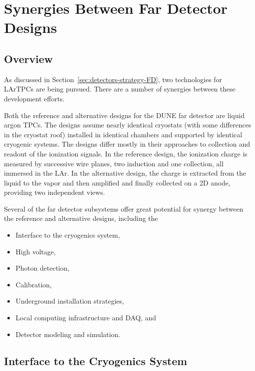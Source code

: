 \chapter{Synergies Between Far Detector Designs}
\label{ch:detectors-synergy}

\section{Overview}

As discussed in Section~\ref{sec:detectors-strategy-FD}, two
technologies for LArTPCs are being pursued. There are a number of
synergies between these development efforts.

Both the reference and alternative designs for the DUNE far detector
are liquid argon TPCs. The designs assume nearly identical cryostats
(with some differences in the cryostat roof) installed in identical chambers and
supported by identical cryogenic systems. The designs differ mostly in
their approaches to collection and readout of the ionization
signals. In the reference design, the ionization charge is measured by
successive wire planes, two induction and one collection, all immersed
in the LAr. In the alternative design, the charge is extracted from
the liquid to the vapor and then amplified and finally collected on a
2D anode, providing two independent views.

Several of the far detector subsystems offer great potential for synergy between the reference and alternative designs, including the
\begin{itemize}
\item Interface to the cryogenics system,
\item High voltage, 
\item Photon detection,
\item Calibration,
\item Underground installation strategies,
\item Local computing infrastructure and DAQ, and
\item Detector modeling and simulation.
\end{itemize}

\section{Interface to the Cryogenics System}

